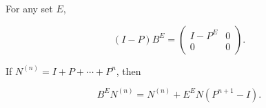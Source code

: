 For any set $E$,

$$(I - P)B^E = \begin{pmatrix} I - P^E & 0 \\ 0 & 0 \end{pmatrix}.$$

If $N^{(n)} = I + P + \cdots + P^n$, then

$$B^E N^{(n)} = N^{(n)} + E^E N(P^{n+1} - I).$$
